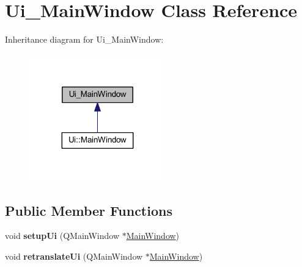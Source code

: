 \hypertarget{class_ui___main_window}{}\section{Ui\+\_\+\+Main\+Window Class Reference}
\label{class_ui___main_window}


Inheritance diagram for Ui\+\_\+\+Main\+Window\+:\nopagebreak
\begin{figure}[H]
\begin{center}
\leavevmode
\includegraphics[width=167pt]{class_ui___main_window__inherit__graph}
\end{center}
\end{figure}
\subsection*{Public Member Functions}
\begin{DoxyCompactItemize}
\item 
\mbox{\label{class_ui___main_window_acf4a0872c4c77d8f43a2ec66ed849b58}} 
void {\bfseries setup\+Ui} (Q\+Main\+Window $\ast$\hyperlink{class_main_window}{Main\+Window})
\item 
\mbox{\label{class_ui___main_window_a097dd160c3534a204904cb374412c618}} 
void {\bfseries retranslate\+Ui} (Q\+Main\+Window $\ast$\hyperlink{class_main_window}{Main\+Window})
\end{DoxyCompactItemize}
